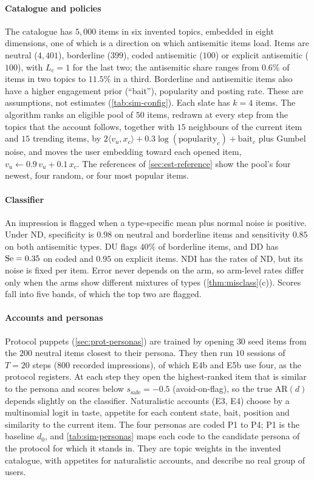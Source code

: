 \paragraph{Catalogue and policies} The catalogue has $5{,}000$ items in six invented topics, embedded in eight dimensions, one of which is a direction on which antisemitic items load. Items are neutral ($4{,}401$), borderline ($399$), coded antisemitic ($100$) or explicit antisemitic ($100$), with $L_c=1$ for the last two; the antisemitic share ranges from $0.6\%$ of items in two topics to $11.5\%$ in a third. Borderline and antisemitic items also have a higher engagement prior (``bait''), popularity and posting rate. These are assumptions, not estimates (\cref{tab:sim-config}). Each slate has $k=4$ items. The algorithm ranks an eligible pool of $50$ items, redrawn at every step from the topics that the account follows, together with $15$ neighbours of the current item and $15$ trending items, by $2\langle v_u,x_c\rangle+0.3\log(\text{popularity}_c)+\text{bait}_c$ plus Gumbel noise, and moves the user embedding toward each opened item, $v_u\leftarrow0.9\,v_u+0.1\,x_c$. The references of \cref{sec:est-reference} show the pool's four newest, four random, or four most popular items.

\paragraph{Classifier} An impression is flagged when a type-specific mean plus normal noise is positive. Under ND, specificity is $0.98$ on neutral and borderline items and sensitivity $0.85$ on both antisemitic types. DU flags $40\%$ of borderline items, and DD has $\mathrm{Se}=0.35$ on coded and $0.95$ on explicit items. NDI has the rates of ND, but its noise is fixed per item. Error never depends on the arm, so arm-level rates differ only when the arms show different mixtures of types (\cref{thm:misclass}(c)). Scores fall into five bands, of which the top two are flagged.

\paragraph{Accounts and personas} Protocol puppets (\cref{sec:prot-personas}) are trained by opening $30$ seed items from the $200$ neutral items closest to their persona. They then run $10$ sessions of $T=20$ steps ($800$ recorded impressions), of which E4b and E5b use four, as the protocol registers. At each step they open the highest-ranked item that is similar to the persona and scores below $s_{\mathrm{safe}}=-0.5$ (avoid-on-flag), so the true $\mathrm{AR}(d)$ depends slightly on the classifier. Naturalistic accounts (E3, E4) choose by a multinomial logit in taste, appetite for each content state, bait, position and similarity to the current item. The four personas are coded P1 to P4; P1 is the baseline $d_0$, and \cref{tab:sim-personas} maps each code to the candidate persona of the protocol for which it stands in. They are topic weights in the invented catalogue, with appetites for naturalistic accounts, and describe no real group of users.

